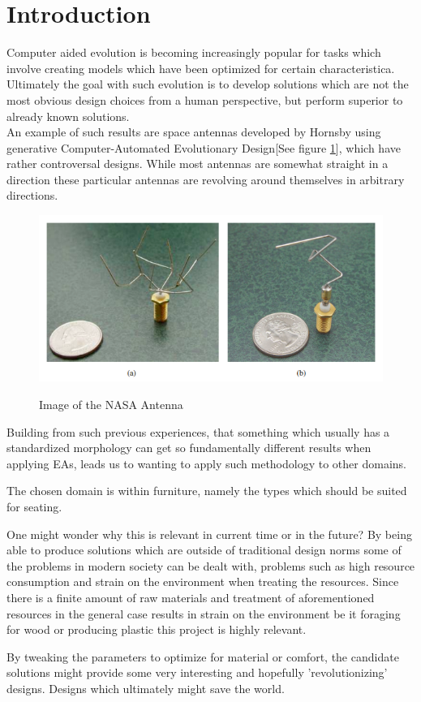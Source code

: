 \section{Introduction}
Computer aided evolution is becoming increasingly popular for tasks which involve creating models which have been optimized for certain characteristica.
Ultimately the goal with such evolution is to develop solutions which are not the most obvious design choices from a human perspective, but perform superior to already known solutions.\\

An example of such results are space antennas developed by Hornsby\cite{paper:ev4} using generative Computer-Automated Evolutionary Design[See figure \ref{fig:nasa_antenna}], which have rather controversal designs. While most antennas are somewhat straight in a direction these particular antennas are revolving around themselves in arbitrary directions.

\begin{figure}[ht]
\includegraphics[scale=.7]{content/img/space_antenna}
\label{fig:nasa_antenna}\\
\caption{Image of the NASA Antenna \cite{paper:ev4} }
\end{figure}

Building from such previous experiences, that something which usually has a standardized morphology can get so fundamentally different results when applying EAs, leads us to wanting to apply such methodology to other domains.

The chosen domain is within furniture, namely the types which should be suited for seating.

One might wonder why this is relevant in current time or in the future?
By being able to produce solutions which are outside of traditional design norms some of the problems in modern society can be dealt with, problems such as high resource consumption and strain on the environment when treating the resources.
Since there is a finite amount of raw materials and treatment of aforementioned  resources in the general case results in strain on the environment be it foraging for wood or producing plastic this project is highly relevant.


By tweaking the parameters to optimize for material or comfort, the candidate solutions might provide some very interesting and hopefully 'revolutionizing' designs. Designs which ultimately might save the world.
